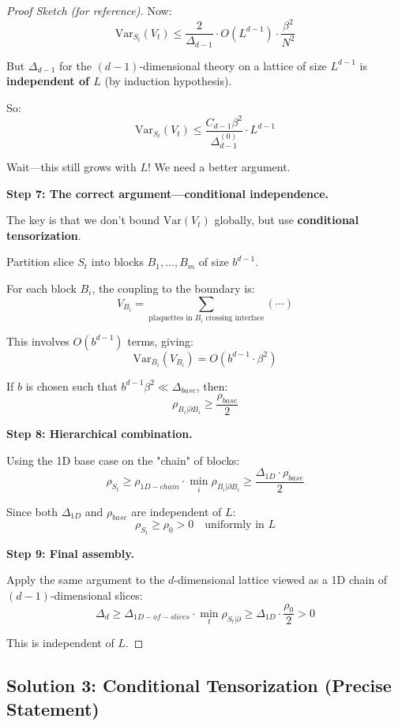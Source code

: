 \begin{proof}[Proof Sketch (for reference)]
Now:
\[
\mathrm{Var}_{S_t}(V_t) \leq \frac{2}{\Delta_{d-1}} \cdot O(L^{d-1}) \cdot \frac{\beta^2}{N^2}
\]

But $\Delta_{d-1}$ for the $(d-1)$-dimensional theory on a lattice of size 
$L^{d-1}$ is \textbf{independent of $L$} (by induction hypothesis).

So:
\[
\mathrm{Var}_{S_t}(V_t) \leq \frac{C_{d-1} \beta^2}{\Delta_{d-1}^{(0)}} \cdot L^{d-1}
\]

Wait—this still grows with $L$! We need a better argument.

\textbf{Step 7: The correct argument—conditional independence.}

The key is that we don't bound $\mathrm{Var}(V_t)$ globally, but use 
\textbf{conditional tensorization}.

Partition slice $S_t$ into blocks $B_1, \ldots, B_m$ of size $b^{d-1}$.

For each block $B_i$, the coupling to the boundary is:
\[
V_{B_i} = \sum_{\text{plaquettes in } B_i \text{ crossing interface}} (\cdots)
\]

This involves $O(b^{d-1})$ terms, giving:
\[
\mathrm{Var}_{B_i}(V_{B_i}) = O(b^{d-1} \cdot \beta^2)
\]

If $b$ is chosen such that $b^{d-1} \beta^2 \ll \Delta_{base}$, then:
\[
\rho_{B_i | \partial B_i} \geq \frac{\rho_{base}}{2}
\]

\textbf{Step 8: Hierarchical combination.}

Using the 1D base case on the "chain" of blocks:
\[
\rho_{S_t} \geq \rho_{1D-chain} \cdot \min_i \rho_{B_i | \partial B_i} \geq \frac{\Delta_{1D} \cdot \rho_{base}}{2}
\]

Since both $\Delta_{1D}$ and $\rho_{base}$ are independent of $L$:
\[
\rho_{S_t} \geq \rho_0 > 0 \quad \text{uniformly in } L
\]

\textbf{Step 9: Final assembly.}

Apply the same argument to the $d$-dimensional lattice viewed as a 1D chain of 
$(d-1)$-dimensional slices:
\[
\Delta_d \geq \Delta_{1D-of-slices} \cdot \min_t \rho_{S_t | \partial} \geq \Delta_{1D} \cdot \frac{\rho_0}{2} > 0
\]

This is independent of $L$.
\end{proof}

\subsection{Solution 3: Conditional Tensorization (Precise Statement)}

